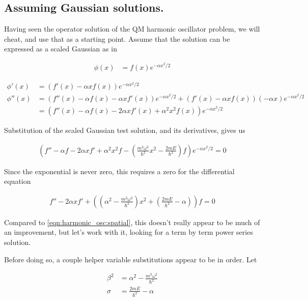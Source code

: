 \subsection{Assuming Gaussian solutions. }

Having seen the operator solution of the QM harmonic oscillator problem, we will cheat, and use that as a starting point.  Assume that
the solution can be expressed as a scaled Gaussian as in

\begin{align}
\phi(x) &= f(x) e^{ - \alpha x^2/2 }
\end{align}

\begin{align*}
\phi'(x) &= \left( f'(x) - \alpha x f(x) \right) e^{ - \alpha x^2/2 } \\
\phi''(x)
&=
\left( f''(x) - \alpha f(x) -\alpha x f'(x) \right) e^{ - \alpha x^2/2 }
+\left( f'(x) - \alpha x f(x) \right) (-\alpha x) e^{ - \alpha x^2/2 } \\
&=
\left( f''(x) - \alpha f(x) - 2 \alpha x f'(x) + \alpha^2 x^2 f(x) \right) e^{ - \alpha x^2/2 }
\end{align*}

Substitution of the scaled Gaussian test solution, and its derivatives, gives us

\begin{align*}
\left( f'' - \alpha f - 2 \alpha x f' + \alpha^2 x^2 f - \left( \frac{m^2 \omega^2}{\hbar^2} x^2 - \frac{2 m E}{\hbar^2} \right) f \right) e^{ -\alpha x^2 /2} = 0
\end{align*}

Since the exponential is never zero, this requires a zero for the differential equation

\begin{align}
f'' - 2 \alpha x f' + \left( \left(\alpha^2 - \frac{m^2 \omega^2}{\hbar^2} \right) x^2 + \left(\frac{2 m E}{\hbar^2} - \alpha \right) \right) f = 0
\end{align}

Compared to \ref{eqn:harmonic_osc:spatial}, this doesn't really appear to be much of an improvement, but let's work with it, looking for a term by term power series solution.

Before doing so, a couple helper variable substitutions appear to be in order.  Let

\begin{align*}
\beta^2 &= \alpha^2 - \frac{m^2 \omega^2}{\hbar^2}  \\
\sigma &= \frac{2 m E}{\hbar^2} - \alpha 
\end{align*}

